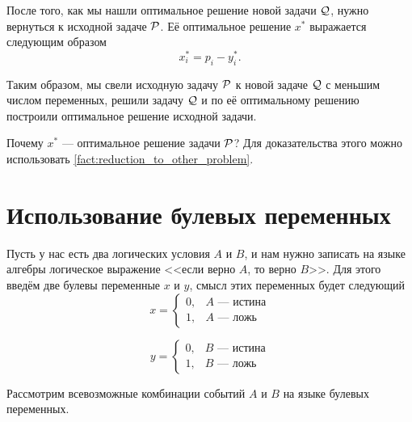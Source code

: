 После того, как мы нашли оптимальное решение новой задачи $\Q$, нужно вернуться к исходной задаче $\P$. Её оптимальное решение $x^*$ выражается следующим образом
\[
x_i^* = p_i - y_i^*.
\]

Таким образом, мы свели исходную задачу $\P$ к новой задаче $\Q$ с меньшим числом переменных, решили задачу $\Q$ и по её оптимальному решению построили оптимальное решение исходной задачи.

Почему $x^*$ --- оптимальное решение задачи $\P$? Для доказательства этого можно использовать \cref{fact:reduction_to_other_problem}.

\section{Использование булевых переменных}


\label{fact:simple_conditions}

Пусть у нас есть два логических условия $A$ и $B$, и нам нужно записать на языке алгебры логическое выражение <<если верно $A$, то верно $B$>>. Для этого введём две булевы переменные $x$ и $y$, смысл этих переменных будет следующий
\[
x = \begin{cases}
	0, & \text{$A$ --- истина} \\
	1, & \text{$A$ --- ложь}
\end{cases}
\]

\[
y = \begin{cases}
	0, & \text{$B$ --- истина} \\
	1, & \text{$B$ --- ложь}
\end{cases}
\]

Рассмотрим всевозможные комбинации событий $A$ и $B$ на языке булевых переменных.

